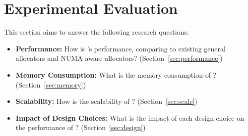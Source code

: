 \section{Experimental Evaluation}
\label{sec:evaluation}

This section aims to answer the following research questions: 

\begin{itemize}
\item \textbf{Performance:} How is \NM{}'s performance, comparing to existing general allocators and NUMA-aware allocators? (Section~\ref{sec:performance}) 
\item \textbf{Memory Consumption:} What is the memory consumption of \NM{}? (Section~\ref{sec:memory})
\item \textbf{Scalability:} How is the scalability of \NM{}? (Section~\ref{sec:scale})
\item \textbf{Impact of Design Choices:} What is the impact of each design choice on the performance of \NM{}? (Section~\ref{sec:design})	
\end{itemize}

